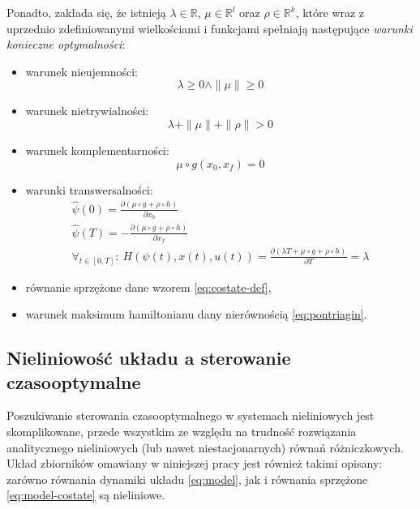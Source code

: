 Ponadto, zakłada się, że istnieją $\lambda \in \mathbb{R}$, $\mu \in \mathbb{R}^{l}$ oraz $\rho \in \mathbb{R}^{k}$, które wraz z uprzednio zdefiniowanymi wielkościami i funkcjami spełniają następujące \emph{warunki konieczne optymalności}:
\begin{itemize}
    \item warunek nieujemności:
    \begin{equation}\label{eq:pontryagin-noneg}
    \lambda \geq 0 \land \|\mu\| \geq 0
    \end{equation}
    \item warunek nietrywialności:
    \begin{equation}\label{eq:pontryagin-notriv}
    \lambda + \|\mu\| + \|\rho\| > 0
    \end{equation}
    \item warunek komplementarności:
    \begin{equation}\label{eq:pontryagin-comp}
    \mu \circ g(x_{0}, x_{f}) = 0
    \end{equation}
    \item warunki transwersalności:
    \begin{equation}\label{eq:pontryagin-trans}
    \begin{array}{lr}
        \hat{\psi}(0) = \frac{\partial (\mu \circ g + \rho \circ h)}{\partial x_{0}}\\[8pt]
        \hat{\psi}(T) = - \frac{\partial (\mu \circ g + \rho \circ h)}{\partial x_{f}}\\[8pt]
        \forall_{t \in [0, T]}:~ H(\psi(t), x(t), u(t)) = \frac{\partial (\lambda T + \mu \circ g + \rho \circ h)}{\partial T} = \lambda
    \end{array}
    \end{equation}
    \item równanie sprzężone dane wzorem \ref{eq:costate-def},
    \item warunek maksimum hamiltonianu dany nierównością \ref{eq:pontriagin}.
\end{itemize}


\subsection{Nieliniowość układu a sterowanie czasooptymalne}
\label{sub:toc-nonlnr}

Poszukiwanie sterowania czasooptymalnego w systemach nieliniowych jest skomplikowane, przede wszystkim ze względu na trudność rozwiązania analitycznego nieliniowych (lub nawet niestacjonarnych) równań różniczkowych. Układ zbiorników omawiany w niniejszej pracy jest również takimi opisany: zarówno równania dynamiki układu \ref{eq:model}, jak i równania sprzężone \ref{eq:model-costate} są nieliniowe.

